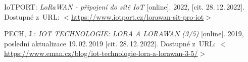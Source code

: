 \begin{thebibliography}{99}
    IoTPORT:
    \emph{LoRaWAN - připojení do sítě IoT}\/ [online].
    2022, [cit. 28.\,12.\,2022].
    Dostupné z~URL:
    \(<\)\url{https://www.iotport.cz/lorawan-sit-pro-iot}\(>\)
    
    PECH, J.:
    \emph{IOT TECHNOLOGIE: LORA A LORAWAN (3/5)}\/ [online].
    2019, poslední aktualizace 19.\,02.\,2019 [cit. 28.\,12.\,2022].
    Dostupné z~URL:
    \(<\)\url{https://www.eman.cz/blog/iot-technologie-lora-a-lorawan-3-5/}\(>\)

\end{thebibliography}


%
%
%
